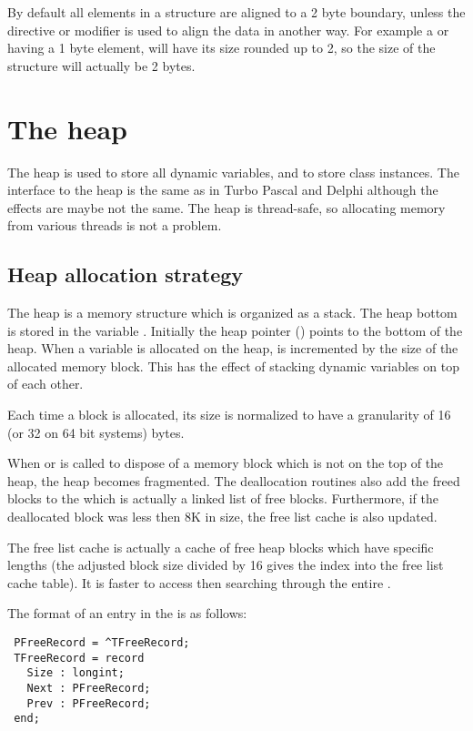 By default all elements in a structure are aligned to a 2 byte boundary,
unless the  directive or  modifier is used
to align the data in another way. For example a  or 
having a 1 byte element, will have its size rounded up to 2, so the size of
the structure will actually be 2 bytes.

\section{The heap}
\label{se:Heap}
The heap is used to store all dynamic variables, and to store class
instances. The interface to the heap is the same as in Turbo Pascal 
and Delphi although the effects are maybe not the same. 
The heap is thread-safe, so allocating memory from various 
threads is not a problem.
\subsection{Heap allocation strategy}

The heap is a memory structure which is organized as a stack. The heap
bottom is stored in the variable . Initially the heap
pointer () points to the bottom of the heap. When a
variable is allocated on the heap,  is incremented by the
size of the allocated memory block. This has the effect of stacking
dynamic variables on top of each other.

Each time a block is allocated, its size is normalized to have
a granularity of 16 (or 32 on 64 bit systems) bytes.

When  or  is called to dispose of a
memory block which is not on the top of the heap, the heap becomes
fragmented. The deallocation routines also add the freed blocks to
the  which is actually a linked list of free blocks.
Furthermore, if the deallocated block was less then 8K in size, the
free list cache is also updated.

The free list cache is actually a cache of free heap blocks which
have specific lengths (the adjusted block size divided by 16 gives the
index into the free list cache table). It is faster to access then
searching through the entire .

The format of an entry in the  is as follows:

\begin{verbatim}
 PFreeRecord = ^TFreeRecord;
 TFreeRecord = record
   Size : longint;
   Next : PFreeRecord;
   Prev : PFreeRecord;
 end;

\end{verbatim}

